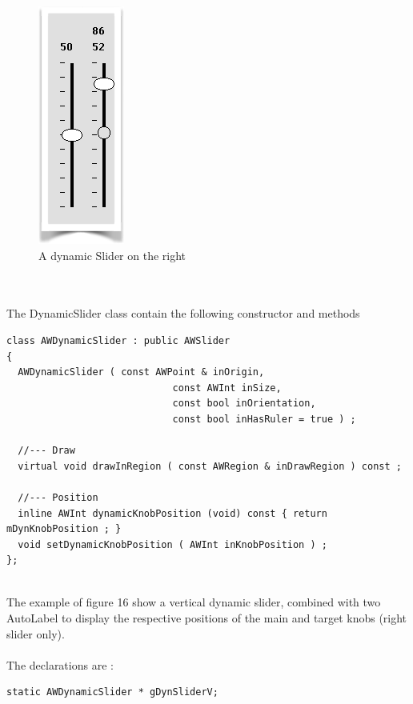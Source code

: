 \documentclass[a4paper,11pt]{extarticle}
\begin{document}
\begin{figure}[htbp]
   \centering
   \includegraphics[scale=0.7]{AWFig13.png} 
   \caption{A dynamic Slider on the right}
   \label{fig:13}
\end{figure}

~\\

~\\ The DynamicSlider class contain the following constructor and methods

\begin{lstlisting}[language=Arduinonl]
class AWDynamicSlider : public AWSlider
{
  AWDynamicSlider ( const AWPoint & inOrigin,
                             const AWInt inSize,
                             const bool inOrientation,
                             const bool inHasRuler = true ) ;
  
  //--- Draw
  virtual void drawInRegion ( const AWRegion & inDrawRegion ) const ;
  
  //--- Position
  inline AWInt dynamicKnobPosition (void) const { return mDynKnobPosition ; }
  void setDynamicKnobPosition ( AWInt inKnobPosition ) ;
};
\end{lstlisting}

~\\ The example of figure 16 show a vertical dynamic slider, combined with two AutoLabel to display the respective positions of the main and target knobs (right slider only).
~\\

~\\ The declarations are :

\begin{lstlisting}[language=Arduinonl]
static AWDynamicSlider * gDynSliderV;
\end{lstlisting}
\end{document}
